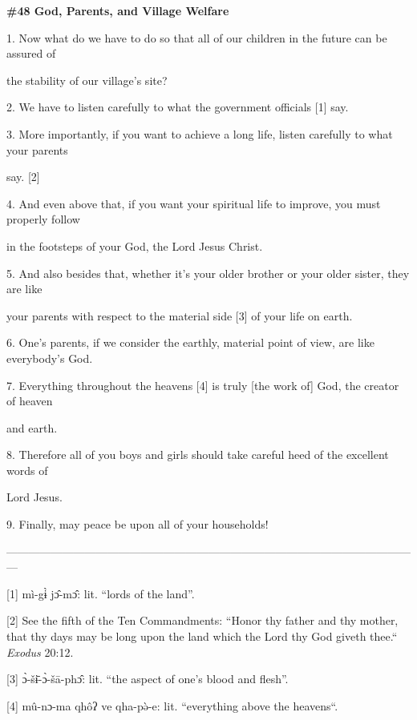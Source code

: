 
{\LARGE{}\textbf{\#48 God, Parents, and Village Welfare}}

{\LARGE{}1. Now what do we have to do so that all of our children in the future
can be assured of     }

{\LARGE{}the  stability of our village's site?}

{\LARGE{}2. We have to listen carefully to what the government officials [1] say.}

{\LARGE{}3. More importantly, if you want to achieve a long life, listen carefully
to what your parents     }

{\LARGE{}say. [2]}

{\LARGE{}4. And even above that, if you want your spiritual life to improve, you
must properly follow     }

{\LARGE{}in the footsteps of your God, the Lord Jesus Christ.}

{\LARGE{}5. And also besides that, whether it's your older brother or your older
sister, they are like     }

{\LARGE{}your parents with respect to the material side [3] of your life on earth.}

{\LARGE{}6. One's parents, if we consider the earthly, material point of view,
are like everybody's God.}

{\LARGE{}7. Everything throughout the heavens [4] is truly [the work of] God, the
creator of heaven     }

{\LARGE{}and earth.}

{\LARGE{}8. Therefore all of you boys and girls should take careful heed of the
excellent words of     }

{\LARGE{}Lord Jesus.}

{\LARGE{}9. Finally, may peace be upon all of your households!}

{\LARGE{}---------------------------------------------------------------------------------------------------------------}

{\LARGE{}[1] mì-gɨ̀ jɔ̂-mɔ̂: lit. ``lords of the land''.}

{\LARGE{}[2] See the fifth of the Ten Commandments: ``Honor thy father
and thy mother, that thy days may be long upon the land which the Lord thy God
giveth thee.`` }{\LARGE{}\textit{Exodus}}{\LARGE{} 20:12.}

{\LARGE{}[3] ɔ̀-šɨ̄-ɔ̀-šā-phɔ̂: lit. ``the aspect of one's blood and
flesh''.}

{\LARGE{}[4] mû-nɔ-ma qhôʔ ve qha-pə̀-e: lit. ``everything above
the heavens``.}


